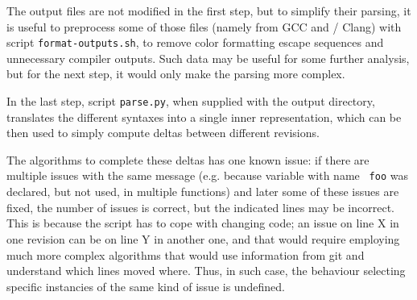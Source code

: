 The output files are not modified in the first step, but to simplify their
parsing, it is useful to preprocess some of those files (namely from GCC and
	/						 Clang) with script
{\tt format-outputs.sh}, to remove color formatting escape sequences and
unnecessary compiler outputs.  Such data may be useful for some further
analysis, but for the next step, it would only make the parsing more complex.

In the last step, script {\tt parse.py}, when supplied with the output
directory, translates the different syntaxes into a single inner
representation, which can be then used to simply compute deltas between
different revisions.

The algorithms to complete these deltas has one known issue: if there are
multiple issues with the same message (e.g. because variable with name {\tt
				       foo} was declared, but not used, in
				       multiple functions) and later some of
these issues are fixed, the number of issues is correct, but the indicated
lines may be incorrect. This is because the script has to cope with changing
code; an issue on line X in one revision can be on line Y in another one, and
that would require employing much more complex algorithms that would use
information from git and understand which lines moved where. Thus, in such
case, the behaviour selecting specific instancies of the same kind of issue is
undefined.


%
%
%

